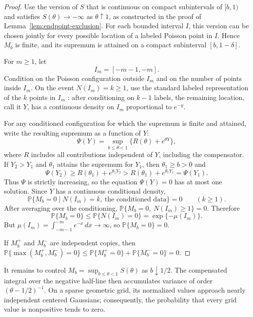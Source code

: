 \begin{proof}
Use the version of \(S\) that is continuous on compact subintervals of
\([b,1)\) and satisfies \(S(\theta)\to-\infty\) as \(\theta\uparrow1\), as
constructed in the proof of Lemma~\ref{lem:endpoint-exclusion}. For each
bounded interval \(I\), this version can be chosen jointly for every possible
location of a labeled Poisson point in \(I\). Hence \(M_b\) is finite, and its supremum is
attained on a compact subinterval \([b,1-\delta]\).

For $m\ge1$, let
\[
    I_m=[-m-1,-m].
\]
Condition on the Poisson configuration outside $I_m$ and on the number of points inside $I_m$. On the event $N(I_m)=k\ge1$, use the standard labeled representation of the $k$ points in $I_m$ \cite{kallenberg2017random}: after conditioning on $k-1$ labels, the remaining location, call it $Y$, has a continuous density on $I_m$ proportional to $e^{-y}$.

For any conditioned configuration for which the supremum is finite and attained, write the resulting supremum as a function of $Y$:
\[
    \Psi(Y)
    =
    \sup_{b\le\theta<1}
    \{R(\theta)+e^{\theta Y}\},
\]
where $R$ includes all contributions independent of $Y$, including the compensator. If $Y_2>Y_1$ and $\theta_1$ attains the supremum for $Y_1$, then $\theta_1\ge b>0$ and
\[
    \Psi(Y_2)
    \ge
    R(\theta_1)+e^{\theta_1Y_2}
    >
    R(\theta_1)+e^{\theta_1Y_1}
    =
    \Psi(Y_1).
\]
Thus $\Psi$ is strictly increasing, so the equation $\Psi(Y)=0$ has at most one solution. Since $Y$ has a continuous conditional density,
\[
    \mathbb P\{M_b=0\mid N(I_m)=k,\ \text{the conditioned data}\}=0
    \qquad(k\ge1).
\]
After averaging over the conditioning, $\mathbb P\{M_b=0,\ N(I_m)\ge1\}=0$.
Therefore
\[
    \mathbb P\{M_b=0\}
    \le
    \mathbb P\{N(I_m)=0\}
    =
    \exp\{-\mu(I_m)\}.
\]
But $\mu(I_m)=\int_{-m-1}^{-m}e^{-x}\,dx\to\infty$, so $\mathbb P\{M_b=0\}=0$.

If $M_b^+$ and $M_b^-$ are independent copies, then $\mathbb P\{\max(M_b^+,M_b^-)=0\}\le \mathbb P\{M_b^+=0\}+\mathbb P\{M_b^-=0\}=0$.
\end{proof}

It remains to control \(M_b=\sup_{b\le\theta<1}S(\theta)\) as
\(b\downarrow1/2\). The compensated integral over the negative half-line then
accumulates variance of order \((\theta-1/2)^{-1}\). On a sparse geometric
grid, its normalized values approach nearly independent centered Gaussians;
consequently, the probability that every grid value is nonpositive tends to
zero.

